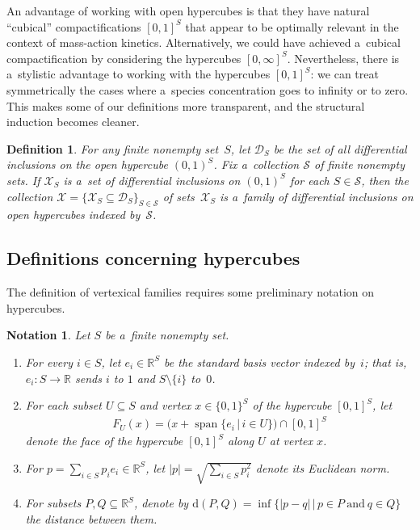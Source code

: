 \documentclass[11pt]{article}
\newtheorem{Definition}[Theorem]{Definition}
\newtheorem{Notation}[Theorem]{Notation}
\begin{document}
An advantage of working with open hypercubes is that they have natural ``cubical'' compactif\/ications $[0,1]^S$ that
appear to be optimally relevant in the context of mass-action kinetics.
Alternatively, we could have achieved a~cubical compactif\/ication by considering the hypercubes $[0,\infty]^S$.
Nevertheless, there is a~stylistic advantage to working with the hypercubes $[0,1]^S$: we can treat symmetrically the
cases where a~species concentration goes to inf\/inity or to zero.
This makes some of our def\/initions more transparent, and the structural induction becomes cleaner.
\begin{Definition}
\label{def:diff_incl_fam}
For any f\/inite nonempty set~$S$, let $\mathcal D_S$ be the set of all dif\/ferential inclusions on the open hypercube
$(0,1)^S$.
Fix a~collection $\mathcal S$ of f\/inite nonempty sets.
If $\mathcal X_S$ is a~set of dif\/ferential inclusions on $(0,1)^S$ for each $S\in\mathcal S$, then the collection
$\mathcal X=\{\mathcal X_S\subseteq\mathcal D_S\}_{S\in\mathcal S}$ of sets~$\mathcal X_S$ is a~\emph{family of
differential inclusions on open hypercubes indexed by~$\mathcal S$}.
\end{Definition}

\subsection{Definitions concerning hypercubes}
\label{sub:hypercubes}

The def\/inition of vertexical families requires some preliminary notation on hypercubes.
\begin{Notation}
Let $S$ be a~f\/inite nonempty set.
\begin{enumerate}\itemsep=0pt
\item For every $i\in S$, let $e_i\in\mathbb{R}^S$ be the standard basis vector indexed by~$i$; that is,
$e_i:S\to\mathbb{R}$ sends $i$ to $1$ and $S\setminus\{i\}$ to~$0$.
\item For each subset $U\subseteq S$ and vertex $x\in\{0,1\}^S$ of the hypercube $[0,1]^S$, let
\begin{gather*}
F_U(x)=\big(x+\operatorname{span}\{e_i\,|\, i\in U\}\big)\cap[0,1]^S
\end{gather*}
denote the face of the hypercube $[0,1]^S$ along $U$ at vertex $x$.
\item For $p=\sum\limits_{i\in S}p_i e_i\in\mathbb{R}^S$, let $|p|=\sqrt{\sum\limits_{i\in S}p_i^2}$ denote its Euclidean norm.
\item For subsets $P,Q\subseteq\mathbb{R}^S$, denote by $\mathrm{d}(P,Q)=\inf\big\{|p-q|\,\big|\, p\in P~\text{and}~q\in
Q\big\}$ the distance between them.
\end{enumerate}
\end{Notation}
\end{document}
